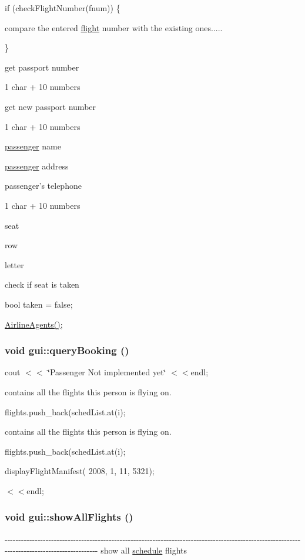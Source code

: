 if (checkFlightNumber(fnum)) \{

compare the entered \hyperlink{classflight}{flight} number with the existing ones.....

\}

get passport number

1 char + 10 numbers

get new passport number

1 char + 10 numbers

\hyperlink{classpassenger}{passenger} name

\hyperlink{classpassenger}{passenger} address

passenger's telephone

1 char + 10 numbers

seat

row

letter

check if seat is taken

bool taken = false;

\hyperlink{classgui_ae39757d1c6bdbfa938dbe3226a36febb}{AirlineAgents()}; \hypertarget{classgui_afa3406b6b5747f7cabcc468721db8c9e}{
\subsubsection[{queryBooking}]{\setlength{\rightskip}{0pt plus 5cm}void gui::queryBooking ()}}
\label{classgui_afa3406b6b5747f7cabcc468721db8c9e}


cout $<$$<$ \char`\"{}Passenger Not implemented yet\char`\"{} $<$$<$endl;

contains all the flights this person is flying on.

flights.push\_\-back(schedList.at(i);

contains all the flights this person is flying on.

flights.push\_\-back(schedList.at(i);

displayFlightManifest( 2008, 1, 11, 5321);

$<$$<$endl; \hypertarget{classgui_a5c6627bafacf8ced6dde1abc32e8dea8}{
\subsubsection[{showAllFlights}]{\setlength{\rightskip}{0pt plus 5cm}void gui::showAllFlights ()}}
\label{classgui_a5c6627bafacf8ced6dde1abc32e8dea8}
-\/-\/-\/-\/-\/-\/-\/-\/-\/-\/-\/-\/-\/-\/-\/-\/-\/-\/-\/-\/-\/-\/-\/-\/-\/-\/-\/-\/-\/-\/-\/-\/-\/-\/-\/-\/-\/-\/-\/-\/-\/-\/-\/-\/-\/-\/-\/-\/-\/-\/-\/-\/-\/-\/-\/-\/-\/-\/-\/-\/-\/-\/-\/-\/-\/-\/-\/-\/-\/-\/-\/-\/-\/-\/-\/-\/-\/-\/-\/-\/-\/-\/-\/-\/-\/-\/-\/-\/-\/-\/-\/-\/-\/-\/-\/-\/-\/-\/-\/-\/-\/-\/-\/-\/-\/-\/-\/-\/-\/-\/-\/-\/-\/-\/-\/-\/-\/-\/-\/-\/-\/-\/-\/-\/-\/-\/-\/-\/-\/-\/-\/-\/-\/-\/-\/-\/-\/-\/-\/-\/-\/-\/ show all \hyperlink{classschedule}{schedule} flights 

